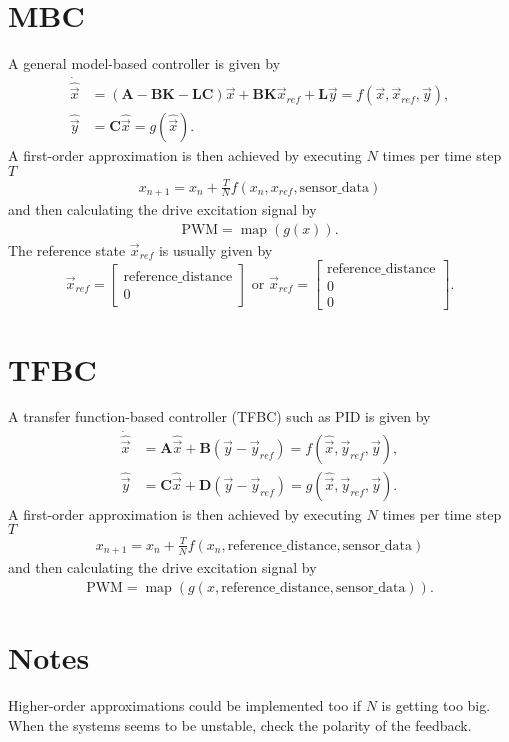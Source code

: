 \documentclass[11pt,titlepage]{report}
\begin{document}
\newcommand{\mat}[1]{\mathbf{#1}}

\chapter*{MBC}
A general model-based controller is given by
\begin{align*}
	\dot{\hat{\vec{x}}} &= (\mat{A}-\mat{B}\mat{K}-\mat{L}\mat{C}) \vec{x} + \mat{B}\mat{K} \vec{x}_{ref} + \mat{L} \vec{y}=f(\vec{x},\vec{x}_{ref},\vec{y}), \\
	\hat{\vec{y}} &= \mat{C} \hat{\vec{x}} = g(\hat{\vec{x}}).
\end{align*}
A first-order approximation is then achieved by executing $N$ times per time step $T$
\begin{align*}
	x_{n+1} = x_{n} + \frac{T}{N}f(x_n, x_{ref}, \text{sensor\_data})
\end{align*}
and then calculating the drive excitation signal by
\begin{align*}
	\text{PWM} = \operatorname{map}(g(x)).
\end{align*}
The reference state $\vec{x}_{ref}$ is usually given by
\begin{equation*}
	\vec{x}_{ref} = \begin{bmatrix}
		\text{reference\_distance} \\
		0
	\end{bmatrix} \text{ or }
	\vec{x}_{ref} = \begin{bmatrix}
		\text{reference\_distance} \\
		0 \\
		0
	\end{bmatrix}.
\end{equation*}

\chapter*{TFBC}
A transfer function-based controller (TFBC) such as PID is given by
\begin{align*}
	\dot{\hat{\vec{x}}} &= \mat{A} \hat{\vec{x}} + \mat{B}(\vec{y}-\vec{y}_{ref})=f(\hat{\vec{x}},\vec{y}_{ref},\vec{y}), \\
	\hat{\vec{y}} &= \mat{C} \hat{\vec{x}} + \mat{D} (\vec{y}-\vec{y}_{ref})=g(\hat{\vec{x}},\vec{y}_{ref},\vec{y}).
\end{align*}
A first-order approximation is then achieved by executing $N$ times per time step $T$
\begin{align*}
	x_{n+1} = x_{n} + \frac{T}{N}f(x_n, \text{reference\_distance}, \text{sensor\_data})
\end{align*}
and then calculating the drive excitation signal by
\begin{align*}
	\text{PWM} = \operatorname{map}(g(x, \text{reference\_distance}, \text{sensor\_data})).
\end{align*}

\chapter*{Notes}
Higher-order approximations could be implemented too if $N$ is getting too big. When the systems seems to be unstable, check the polarity of the feedback.
\end{document}
